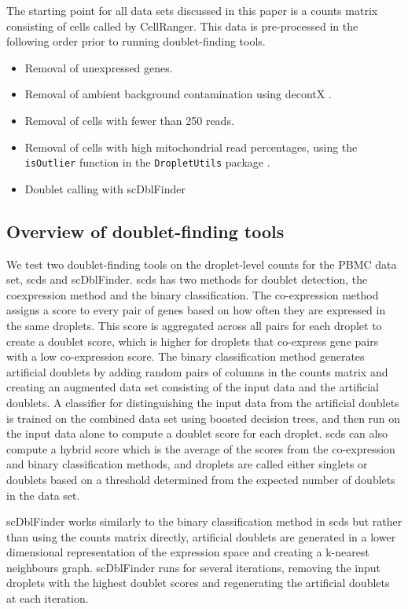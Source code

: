 \documentclass[unnumsec,webpdf,modern,large]{oup-authoring-template}
\begin{document}
	The starting point for all data sets discussed in this paper is a counts matrix consisting of cells called by CellRanger. This data is pre-processed in the following order prior to running doublet-finding tools. 
	\begin{itemize}
		\item Removal of unexpressed genes.
		\item Removal of ambient background contamination using decontX 
		\citep{Yang2020}.
		\item Removal of cells with fewer than 250 reads.
		\item Removal of cells with high mitochondrial read percentages, using the \texttt{isOutlier} function in the \texttt{DropletUtils} package
		\citep{Griffiths2018, Lun2019}.		
		\item Doublet calling with scDblFinder
		\citep{Germain2021}
	\end{itemize} 
	
	\subsection{Overview of doublet-finding tools}
	
	We test two doublet-finding tools on the droplet-level counts for the PBMC data set, scds and scDblFinder. 
	scds 
	\citep{Bais2020}
	has two methods for doublet detection, the coexpression method and the binary classification. 
	The co-expression method assigns a score to every pair of genes based on how often they are expressed in the same droplets. 
	This score is aggregated across all pairs for each droplet to create a doublet score, which is higher for droplets that co-express gene pairs with a low co-expression score. The binary classification method generates artificial doublets by adding random pairs of columns in the counts matrix and creating an augmented data set consisting of the input data and the artificial doublets. 
	A classifier for distinguishing the input data from the artificial doublets is trained on the combined data set using boosted decision trees, and then run on the input data alone to compute a doublet score for each droplet. scds can also compute a hybrid score which is the average of the scores from the co-expression and binary classification methods, and droplets are called either singlets or doublets based on a threshold determined from the expected number of doublets in the data set.
	
	scDblFinder 
	\citep{Germain2021}works similarly to the binary classification method in scds but rather than using the counts matrix directly, artificial doublets are generated in a lower dimensional representation of the expression space and creating a k-nearest neighbours graph.
	scDblFinder runs for several iterations, removing the input droplets with the highest doublet scores and regenerating the artificial doublets at each iteration. 		
	
\end{document}
